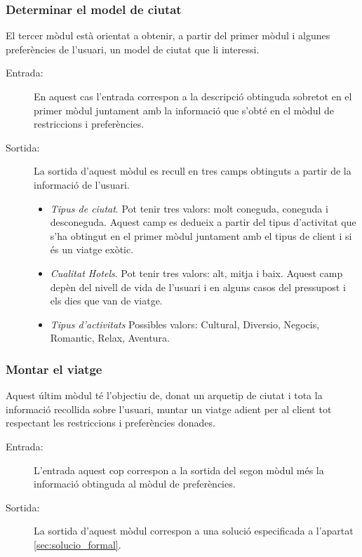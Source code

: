 \documentclass[11pt,a4paper]{article}
\begin{document}
\subsubsection{Determinar el model de ciutat}

El tercer mòdul està orientat a obtenir, a partir del primer mòdul i algunes preferències de l'usuari, un model de ciutat que li interessi.

\begin{description}
	\item[Entrada:] En aquest cas l'entrada correspon a la descripció obtinguda sobretot en el primer mòdul juntament amb la informació que s'obté en el mòdul de restriccions i preferències. 

	\item[Sortida:] La sortida d'aquest mòdul es recull en tres camps obtinguts a partir de la informació de l'usuari. 
	\begin{itemize}
	\item \emph{Tipus de ciutat}. Pot tenir tres valors: molt coneguda, coneguda i desconeguda.
	Aquest camp es dedueix a partir del tipus d'activitat que s'ha obtingut en el primer mòdul juntament amb el tipus de client i si és un viatge exòtic.
	\item \emph{Cualitat Hotels}. Pot tenir tres valors: alt, mitja i baix.
	Aquest camp depèn del nivell de vida de l'usuari i en alguns casos del pressupost i els dies que van de viatge.
	\item \emph{Tipus d'activitats} Possibles valors: Cultural, Diversio, Negocis, Romantic, Relax, Aventura.
	
	\end{itemize}

\end{description}


\subsubsection{Montar el viatge}

Aquest últim mòdul té l'objectiu de, donat un arquetip de ciutat i tota la informació recollida sobre l'usuari, muntar un viatge adient per al client tot respectant les restriccions i preferències donades.

\begin{description}
\item[Entrada:] L'entrada aquest cop correspon a la sortida del segon mòdul més la informació obtinguda al mòdul de preferències.

\item[Sortida:] La sortida d'aquest mòdul correspon a una solució especificada a l'apartat \ref{sec:solucio_formal}.
\end{description}
\end{document}
